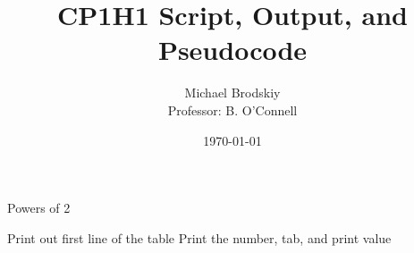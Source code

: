 


\title{CP1H1 Script, Output, and Pseudocode}
\date{\today}
\author{Michael Brodskiy\\ \small Professor: B. O'Connell}



\maketitle

    \begin{algorithm}
      \caption{Powers of 2}\label{2}
      \begin{algorithmic}[1]
        \State Print out first line of the table
            \State Print the number, tab, and print value
        \EndFor
      \end{algorithmic}
    \end{algorithm}








